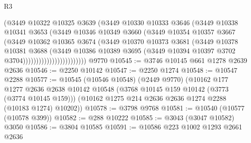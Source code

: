 \begin{lexlean}{R3}
\begin{coremodule}
                                (@3449
                                  @10322
                                  @10325
                                  @3639
                                  (@3449
                                    @10330
                                    @10333
                                    @3646
                                    (@3449
                                      @10338
                                      @10341
                                      @3653
                                      (@3449
                                        @10346
                                        @10349
                                        @3660
                                        (@3449
                                          @10354
                                          @10357
                                          @3667
                                          (@3449
                                            @10362
                                            @10365
                                            @3674
                                            (@3449
                                              @10370
                                              @10373
                                              @3681
                                              (@3449
                                                @10378
                                                @10381
                                                @3688
                                                (@3449
                                                  @10386
                                                  @10389
                                                  @3695
                                                  (@3449
                                                    @10394
                                                    @10397
                                                    @3702
                                                    @3704))))))))))))))))))))))))
    @9770
@10545 := @3746 @10145 @661 @1278 @2639 @2636
@10546 := @2250 @10142
@10547 := @2250 @1274
@10548 := @10547 @2288
@10577 := @10545
    (@10546 @10548)
    (@2449 @9770)
    (@10162
      @177
      @1277
      @2636
      @2638
      @10142
      @10548
      (@3768 @10145 @159 @10142 (@3773 (@3774 @10145 @159)))
      (@10162 @1275 @214 @2636 @2636 @1274 @2288 (@10183 @1274) @10202))
@10578 := @3798 @9768
@10581 := @10540 (@10577 (@10578 @399))
@10582 := @288 @10222
@10585 := @3043 (@3047 @10582) @3050
@10586 := @3804 @10585
@10591 := @10586 @223 @1002 @1293 @2661 @2636

\end{coremodule}
\end{lexlean}

